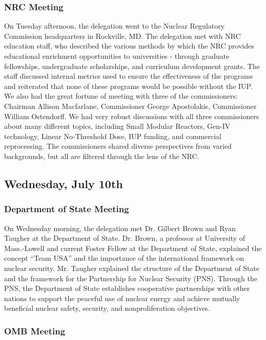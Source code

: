 \subsubsection*{NRC Meeting}

On Tuesday afternoon, the delegation went to the Nuclear Regulatory Commission
headquarters in Rockville, MD. The delegation met with NRC education staff, who
described the various methods by which the NRC provides educational enrichment
opportunities to universities - through graduate fellowships, undergraduate
scholarships, and curriculum development grants. The staff discussed internal
metrics used to ensure the effectiveness of the programs and reiterated that
none of these programs would be possible without the IUP. We also had the great
fortune of meeting with three of the commissioners: Chairman Allison Macfarlane,
Commissioner George Apostolakis, Commissioner William Ostendorff. We had very
robust discussions with all three commissioners about many different topics,
including Small Modular Reactors, Gen-IV technology, Linear No-Threshold Dose,
IUP funding, and commercial reprocessing. The commissioners shared diverse
perspectives from varied backgrounds, but all are filtered through the lens of
the NRC.

\subsection*{Wednesday, July 10th}

\subsubsection*{Department of State Meeting}

On Wednesday morning, the delegation met Dr. Gilbert Brown and Ryan Taugher at
the Department of State. Dr. Brown, a professor at University of Mass.-Lowell
and current Foster Fellow at the Department of State, explained the concept
``Team USA'' and the importance of the international framework on nuclear
security. Mr. Taugher explained the structure of the Department of State and the
framework for the Partnership for Nuclear Security (PNS). Through the PNS, the
Department of State establishes cooperative partnerships with other nations to
support the peaceful use of nuclear energy and achieve mutually beneficial
nuclear safety, security, and nonproliferation objectives.
 
\subsubsection*{OMB Meeting}

